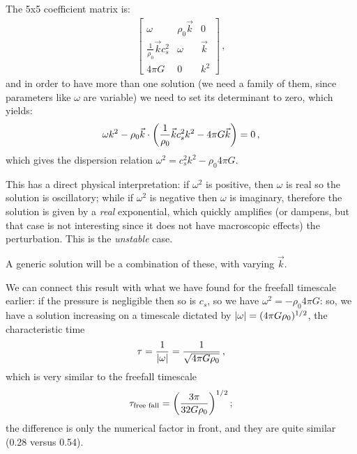 \documentclass[main.tex]{subfiles}
\begin{document}
The 5x5 coefficient matrix is:
%
\begin{subequations}
\begin{align}
  \left[\begin{array}{ccc}
  \omega  & \rho_0 \vec{k}  & 0 \\ 
  \frac{1}{\rho_0 } \vec{k} c_s^2 & \omega  & \vec{k} \\ 
  4 \pi G & 0 & k^2
  \end{array}\right]
  \,,
\end{align}
\end{subequations}
%
and in order to have more than one solution (we need a family of them, since parameters like \(\omega \) are variable) we need to set its determinant to zero, which yields:
%
\begin{align}
  \omega k^2 - \rho_0 \vec{k} \cdot \qty( \frac{1}{\rho_0 }\vec{k} c_s^2 k^2 - 4 \pi G \vec{k} ) = 0
\,,
\end{align}
%
which gives the dispersion relation \(\omega^2 = c_s^2 k^2 - \rho_0 4 \pi G \). 

This has a direct physical interpretation: if \(\omega^2\) is positive, then \(\omega \) is real so the solution is oscillatory; while if \(\omega^2\) is negative then \(\omega \) is imaginary, therefore the solution is given by a \emph{real} exponential, which quickly amplifies (or dampens, but that case is not interesting since it does not have macroscopic effects) the perturbation. This is the \emph{unstable} case.

A generic solution will be a combination of these, with varying \(\vec{k}\).

We can connect this result with what we have found for the freefall timescale earlier: if the pressure is negligible then so is \(c_s\), so we have \(\omega^2 = - \rho_0 4 \pi G\): so, we have a solution increasing on a timescale dictated by \(\abs{\omega} = (4 \pi G \rho_0  )^{1/2}\), the characteristic time  
%
\begin{align}
  \tau = \frac{1}{\abs{\omega }} = \frac{1}{\sqrt{4 \pi G \rho_0 }}
\,,
\end{align}
%
which is very similar to the freefall timescale
%
\begin{align}
  \tau _{\text{free fall}} = \qty(\frac{3 \pi }{ 32 G \rho_0 })^{1/2}
\,;
\end{align}
%
the difference is only the numerical factor in front, and they are quite similar (\num{.28} versus \num{.54}). 
\end{document}
